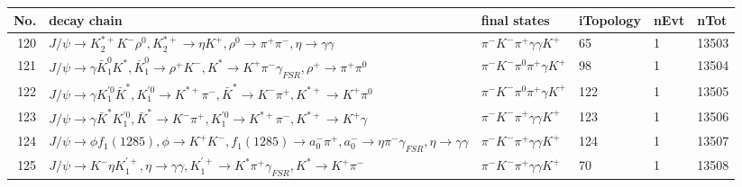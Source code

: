 \begin{table}[htbp] 
\begin{center}
\begin{small}
\begin{tabular}{rlllll}\hline\hline
 No. & decay chain & final states &  iTopology & nEvt & nTot \\\hline
120&$J/\psi       \rightarrow K_2^{*+}       K^{-}          \rho^{0}      , K_2^{*+}        \rightarrow \eta          K^{+}          , \rho^{0}       \rightarrow \pi^{+}        \pi^{-}        , \eta           \rightarrow \gamma       \gamma       $&$\pi^{-}        K^{-}          \pi^{+}        \gamma       \gamma       K^{+}          $&   65&    1&13503\\
121&$J/\psi       \rightarrow \gamma       \bar{K}_1^{0} K^{*}          , \bar{K}_1^{0}  \rightarrow \rho^{+}      K^{-}          , K^{*}           \rightarrow K^{+}          \pi^{-}        \gamma_{FSR} , \rho^{+}       \rightarrow \pi^{+}        \pi^{0}        $&$\pi^{-}        K^{-}          \pi^{0}        \pi^{+}        \gamma       K^{+}          $&   98&    1&13504\\
122&$J/\psi       \rightarrow \gamma       K_1^{'0}      \bar{K}^{*}   , K_1^{'0}       \rightarrow K^{*+}         \pi^{-}        , \bar{K}^{*}    \rightarrow K^{-}          \pi^{+}        , K^{*+}          \rightarrow K^{+}          \pi^{0}        $&$\pi^{-}        K^{-}          \pi^{0}        \pi^{+}        \gamma       K^{+}          $&  122&    1&13505\\
123&$J/\psi       \rightarrow \gamma       \bar{K}^{*}   K_1^{'0}      , \bar{K}^{*}    \rightarrow K^{-}          \pi^{+}        , K_1^{'0}       \rightarrow K^{*+}         \pi^{-}        , K^{*+}          \rightarrow K^{+}          \gamma       $&$\pi^{-}        K^{-}          \pi^{+}        \gamma       \gamma       K^{+}          $&  123&    1&13506\\
124&$J/\psi       \rightarrow \phi           f_{1}(1285)    , \phi            \rightarrow K^{+}          K^{-}          , f_{1}(1285)     \rightarrow a_{0}^{-}      \pi^{+}        , a_{0}^{-}       \rightarrow \eta          \pi^{-}        \gamma_{FSR} , \eta           \rightarrow \gamma       \gamma       $&$\pi^{-}        K^{-}          \pi^{+}        \gamma       \gamma       K^{+}          $&  124&    1&13507\\
125&$J/\psi       \rightarrow K^{-}          \eta          K_1^{'+}      , \eta           \rightarrow \gamma       \gamma       , K_1^{'+}       \rightarrow K^{*}          \pi^{+}        \gamma_{FSR} , K^{*}           \rightarrow K^{+}          \pi^{-}        $&$\pi^{-}        K^{-}          \pi^{+}        \gamma       \gamma       K^{+}          $&   70&    1&13508\\

\end{tabular}
\end{small}
\end{center}
\end{table}
